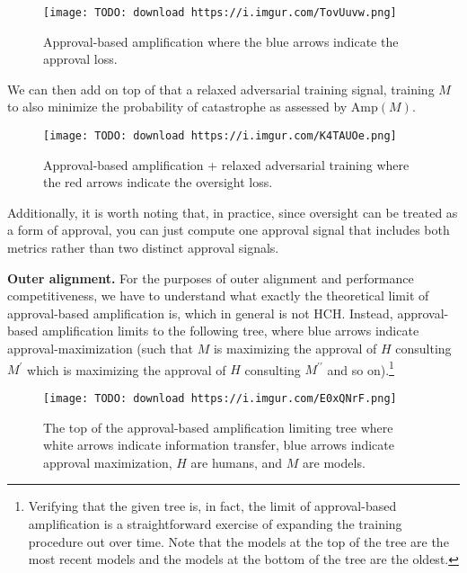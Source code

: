 \begin{figure}[h!]
  \centering
  \texttt{[image: TODO: download https://i.imgur.com/TovUuvw.png]}
  \caption{Approval-based amplification where the blue arrows indicate the approval loss.}
\end{figure}

We can then add on top of that a relaxed adversarial training signal, training $M$ to also minimize the probability of catastrophe as assessed by $\text{Amp}(M)$.

\begin{figure}[h!]
  \centering
  \texttt{[image: TODO: download https://i.imgur.com/K4TAUOe.png]}
  \caption{Approval-based amplification + relaxed adversarial training where the red arrows indicate the oversight loss.}
\end{figure}

Additionally, it is worth noting that, in practice, since oversight can be treated as a form of approval, you can just compute one approval signal that includes both metrics rather than two distinct approval signals.

\textbf{Outer alignment.} For the purposes of outer alignment and performance competitiveness, we have to understand what exactly the theoretical limit of approval-based amplification is, which in general is not HCH. Instead, approval-based amplification limits to the following tree, where blue arrows indicate approval-maximization (such that $M$ is maximizing the approval of $H$ consulting $M^\prime$ which is maximizing the approval of $H$ consulting $M^{\prime\prime}$ and so on).\footnote{Verifying that the given tree is, in fact, the limit of approval-based amplification is a straightforward exercise of expanding the training procedure out over time. Note that the models at the top of the tree are the most recent models and the models at the bottom of the tree are the oldest.}

\begin{figure}[h!]
  \centering
  \texttt{[image: TODO: download https://i.imgur.com/E0xQNrF.png]}
  \caption{The top of the approval-based amplification limiting tree where white arrows indicate information transfer, blue arrows indicate approval maximization, $H$ are humans, and $M$ are models.}
\end{figure}

